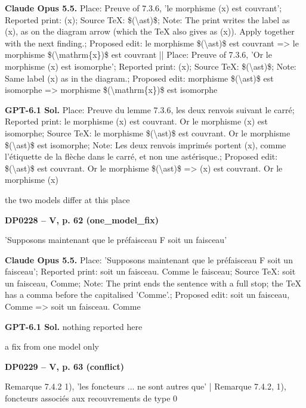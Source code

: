 \textbf{Claude Opus 5.5.} Place: Preuve of 7.3.6, 'le morphisme (x) est couvrant'; Reported print: (x); Source TeX: \$(\textbackslash{}ast)\$; Note: The print writes the label as (x), as on the diagram arrow (which the TeX also gives as (x)). Apply together with the next finding.; Proposed edit: le morphisme \$(\textbackslash{}ast)\$ est couvrant =\allowbreak > le morphisme \$(\textbackslash{}mathrm\{x\})\$ est couvrant || Place: Preuve of 7.3.6, 'Or le morphisme (x) est isomorphe'; Reported print: (x); Source TeX: \$(\textbackslash{}ast)\$; Note: Same label (x) as in the diagram.; Proposed edit: morphisme \$(\textbackslash{}ast)\$ est isomorphe =\allowbreak > morphisme \$(\textbackslash{}mathrm\{x\})\$ est isomorphe\par
\textbf{GPT-6.1 Sol.} Place: Preuve du lemme 7.3.6, les deux renvois suivant le carré; Reported print: le morphisme (x) est couvrant. Or le morphisme (x) est isomorphe; Source TeX: le morphisme \$(\textbackslash{}ast)\$ est couvrant. Or le morphisme \$(\textbackslash{}ast)\$ est isomorphe; Note: Les deux renvois imprimés portent (x), comme l'étiquette de la flèche dans le carré, et non une astérisque.; Proposed edit: \$(\textbackslash{}ast)\$ est couvrant. Or le morphisme \$(\textbackslash{}ast)\$ =\allowbreak > (x) est couvrant. Or le morphisme (x)\par
the two models differ at this place\par
\par\noindent\hypertarget{DP0228}{}\textbf{DP0228 -- V, p. 62 (one\_model\_fix)}\par
'Supposons maintenant que le préfaisceau F soit un faisceau'\par
\textbf{Claude Opus 5.5.} Place: 'Supposons maintenant que le préfaisceau F soit un faisceau'; Reported print: soit un faisceau. Comme le faisceau; Source TeX: soit un faisceau, Comme; Note: The print ends the sentence with a full stop; the TeX has a comma before the capitalised 'Comme'.; Proposed edit: soit un faisceau, Comme =\allowbreak > soit un faisceau. Comme\par
\textbf{GPT-6.1 Sol.} nothing reported here\par
a fix from one model only\par
\par\noindent\hypertarget{DP0229}{}\textbf{DP0229 -- V, p. 63 (conflict)}\par
Remarque 7.4.2 1), 'les foncteurs ... ne sont autres que' | Remarque 7.4.2, 1), foncteurs associés aux recouvrements de type 0\par
